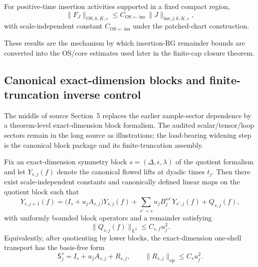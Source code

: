 \begin{theorem}
For positive-time insertion activities supported in a fixed compact region,
\[
\|F_J\|_{\mathrm{OS};k,K,\varepsilon}
\le C_{\mathrm{OS}\leftarrow\mathrm{ins}}\,\|J\|_{\mathrm{ins};j;k,K,\varepsilon},
\]
with scale-independent constant $C_{\mathrm{OS}\leftarrow\mathrm{ins}}$ under the patched-chart construction.
\end{theorem}

These results are the mechanism by which insertion-RG remainder bounds are converted into the OS/core estimates used later in the finite-cap closure theorem.

\subsection{Canonical exact-dimension blocks and finite-truncation inverse control}
The middle of source Section~5 replaces the earlier sample-sector dependence by a theorem-level exact-dimension block formalism. The audited scalar/tensor/loop sectors remain in the long source as illustrations; the load-bearing widening step is the canonical block package and its finite-truncation assembly.

\begin{theorem}
Fix an exact-dimension symmetry block $s=(\Delta,\epsilon,\lambda)$ of the quotient formalism and let $Y_{s,j}(f)$ denote the canonical flowed lifts at dyadic times $t_j$. Then there exist scale-independent constants and canonically defined linear maps on the quotient block such that
\[
Y_{s,j+1}(f)
=
\bigl(I_s+u_jA_{s,j}\bigr)Y_{s,j}(f)
+
\sum_{s'\prec s}u_jB^{ss'}_jY_{s',j}(f)
+
Q_{s,j}(f),
\]
with uniformly bounded block operators and a remainder satisfying
\[
\|Q_{s,j}(f)\|_{L^2}\le C_{s,f}u_j^2.
\]
Equivalently, after quotienting by lower blocks, the exact-dimension one-shell transport has the basis-free form
\[
\mathsf S^s_j=I_s+u_jA_{s,j}+R_{s,j},
\qquad
\|R_{s,j}\|_{\mathrm{op}}\le C_su_j^2.
\]
\end{theorem}

